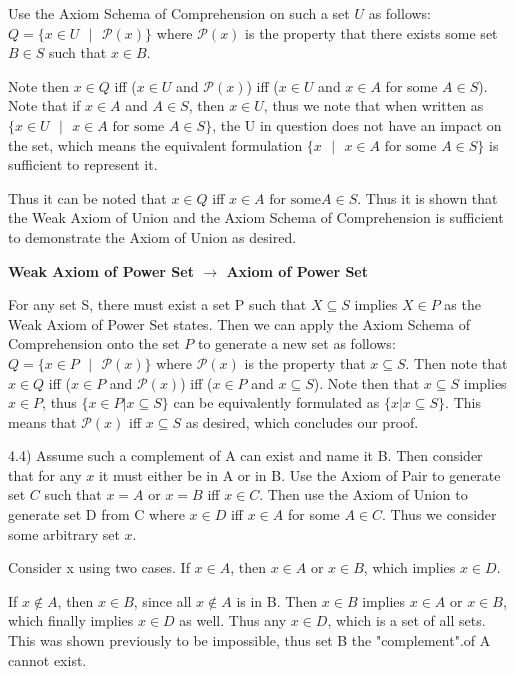 \documentclass{article}
\begin{document}
\medskip

Use the Axiom Schema of Comprehension on such a set $U$ as follows: $Q = \{x \in U \text{ } | \text{ } \mathcal{P}(x)\}$ where $\mathcal{P}(x)$ is the property that there exists some set $B \in S$ such that $x \in B$. 

\medskip

Note then $x \in Q$ iff ($x \in U$ and $\mathcal{P}(x)$) iff ($x \in U$ and $x \in A$ for some $A \in S$). Note that if $x \in A$ and $A \in S$, then $x \in U$, thus we note that when written as $\{x \in U \text{ } | \text{ } x \in A \text{ for some } A \in S\}$, the U in question does not have an impact on the set, which means the equivalent formulation $\{x \text{ } | \text{ } x \in A \text{ for some } A \in S\}$ is sufficient to represent it.

\medskip
Thus it can be noted that $x \in Q$ iff $x \in A \text { for some} A \in S$. Thus it is shown that the Weak Axiom of Union and the Axiom Schema of Comprehension is sufficient to demonstrate the Axiom of Union as desired.

\medskip
\textbf{Weak Axiom of Power Set $\xrightarrow{}$ Axiom of Power Set}
\medskip

For any set S, there must exist a set P such that $X \subseteq S$ implies $X \in P$ as the Weak Axiom of Power Set states.
Then we can apply the Axiom Schema of Comprehension onto the set $P$ to generate a new set as follows: $Q = \{x \in P \text{ } | \text{ } \mathcal{P}(x)\}$ where $\mathcal{P}(x)$ is the property that $x \subseteq S$. Then note that $x \in Q$ iff ($x \in P$ and $\mathcal{P}(x)$) iff ($x \in P$ and $x \subseteq S$). Note then that $x \subseteq S$ implies $x \in P$, thus $\{x \in P | x \subseteq S\}$ can be equivalently formulated as $\{x | x \subseteq S\}$. This means that $\mathcal{P}(x)$ iff $x \subseteq S$ as desired, which concludes our proof.

\medskip

4.4)
Assume such a complement of A can exist and name it B. Then consider that for any $x$ it must either be in A or in B. Use the Axiom of Pair to generate set $C$ such that $x = A$ or $x = B$ iff $x \in C$. Then use the Axiom of Union to generate set D from C where $x \in D$ iff $x \in A$ for some $A \in C$. Thus we consider some arbitrary set $x$. 

\medskip
Consider x using two cases. If $x \in A$, then $x \in A$ or $x \in B$, which implies $x \in D$.

\medskip
If $x \notin A$, then $x \in B$, since all $x \notin A$ is in B. Then $x \in B$ implies $x \in A$ or $x \in B$, which finally implies $x \in D$ as well. Thus any $x \in D$, which is a set of all sets. This was shown previously to be impossible, thus set B the "complement".of A cannot exist.
\end{document}

